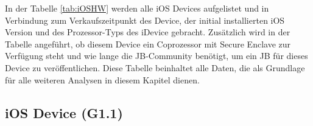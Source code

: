 In der Tabelle \ref{tab:iOSHW} werden alle iOS Devices aufgelistet und in Verbindung zum Verkaufszeitpunkt des Device, der initial installierten iOS Version und des Prozessor-Typs des iDevice gebracht. Zusätzlich wird in der Tabelle angeführt, ob diesem Device ein Coprozessor mit Secure Enclave zur Verfügung steht und wie lange die JB-Community benötigt, um ein JB für dieses Device zu veröffentlichen. Diese Tabelle beinhaltet alle Daten, die als Grundlage für alle weiteren Analysen in diesem Kapitel dienen.\par


\subsection{iOS Device (G1.1)}
\label{sec:Frage1iOSDevice} 

